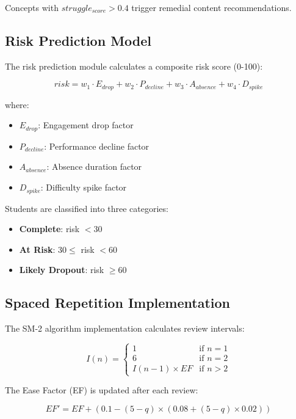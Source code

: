 \documentclass[conference]{IEEEtran}
\begin{document}
Concepts with $struggle_{score} > 0.4$ trigger remedial content recommendations.

\subsection{Risk Prediction Model}

The risk prediction module calculates a composite risk score (0-100):

\begin{equation}
risk = w_1 \cdot E_{drop} + w_2 \cdot P_{decline} + w_3 \cdot A_{absence} + w_4 \cdot D_{spike}
\end{equation}

where:
\begin{itemize}
    \item $E_{drop}$: Engagement drop factor
    \item $P_{decline}$: Performance decline factor
    \item $A_{absence}$: Absence duration factor
    \item $D_{spike}$: Difficulty spike factor
\end{itemize}

Students are classified into three categories:
\begin{itemize}
    \item \textbf{Complete}: risk $< 30$
    \item \textbf{At Risk}: $30 \leq$ risk $< 60$
    \item \textbf{Likely Dropout}: risk $\geq 60$
\end{itemize}

\subsection{Spaced Repetition Implementation}

The SM-2 algorithm implementation calculates review intervals:

\begin{equation}
I(n) = \begin{cases}
1 & \text{if } n = 1 \\
6 & \text{if } n = 2 \\
I(n-1) \times EF & \text{if } n > 2
\end{cases}
\end{equation}

The Ease Factor (EF) is updated after each review:

\begin{equation}
EF' = EF + (0.1 - (5-q) \times (0.08 + (5-q) \times 0.02))
\end{equation}
\end{document}
